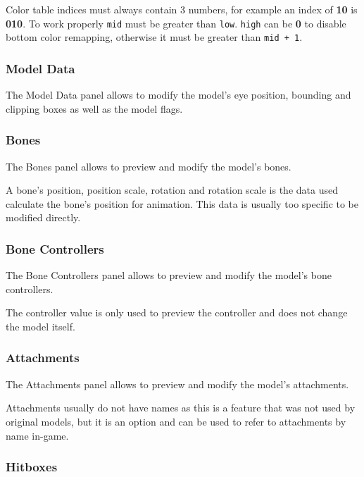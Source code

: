 \documentclass[10pt, a4paper, titlepage, oneside]{article}
\newcommand{\code}[1]{\mbox{\texttt{#1}}}
\begin{document}
Color table indices must always contain 3 numbers, for example an index of \textbf{10} is \textbf{010}. To work properly \code{mid} must be greater than \code{low}. \code{high} can be \textbf{0} to disable bottom color remapping, otherwise it must be greater than \code{mid + 1}.

\subsubsection{Model Data}

The Model Data panel allows to modify the model's eye position, bounding and clipping boxes as well as the model flags.

\subsubsection{Bones}

The Bones panel allows to preview and modify the model's bones.

\vspace{\baselineskip}
A bone's position, position scale, rotation and rotation scale is the data used calculate the bone's position for animation. This data is usually too specific to be modified directly.

\subsubsection{Bone Controllers}

The Bone Controllers panel allows to preview and modify the model's bone controllers.

\vspace{\baselineskip}
The controller value is only used to preview the controller and does not change the model itself.

\subsubsection{Attachments}

The Attachments panel allows to preview and modify the model's attachments.

\vspace{\baselineskip}
Attachments usually do not have names as this is a feature that was not used by original models, but it is an option and can be used to refer to attachments by name in-game.

\subsubsection{Hitboxes}
\end{document}
